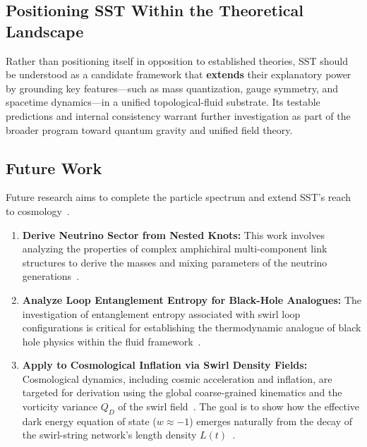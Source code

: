 \documentclass[10pt,reprint,aps,onecolumn,nofootinbib]{revtex4-2}
\begin{document}
\subsection*{Positioning SST Within the Theoretical Landscape}
    Rather than positioning itself in opposition to established theories, SST should be understood as a candidate framework that \textbf{extends} their explanatory power by grounding key features—such as mass quantization, gauge symmetry, and spacetime dynamics—in a unified topological-fluid substrate. Its testable predictions and internal consistency warrant further investigation as part of the broader program toward quantum gravity and unified field theory.


\subsection*{Future Work}
Future research aims to complete the particle spectrum and extend SST's reach to cosmology~\cite{1}.
\begin{enumerate}
    \item \textbf{Derive Neutrino Sector from Nested Knots:} This work involves analyzing the properties of complex amphichiral multi-component link structures to derive the masses and mixing parameters of the neutrino generations~\cite{4}.
    \item \textbf{Analyze Loop Entanglement Entropy for Black-Hole Analogues:} The investigation of entanglement entropy associated with swirl loop configurations is critical for establishing the thermodynamic analogue of black hole physics within the fluid framework~\cite{1}.
    \item \textbf{Apply to Cosmological Inflation via Swirl Density Fields:} Cosmological dynamics, including cosmic acceleration and inflation, are targeted for derivation using the global coarse-grained kinematics and the vorticity variance $Q_D$ of the swirl field~\cite{1}. The goal is to show how the effective dark energy equation of state ($w \approx -1$) emerges naturally from the decay of the swirl-string network's length density $L(t)$~\cite{1}.
\end{enumerate}
\end{document}
